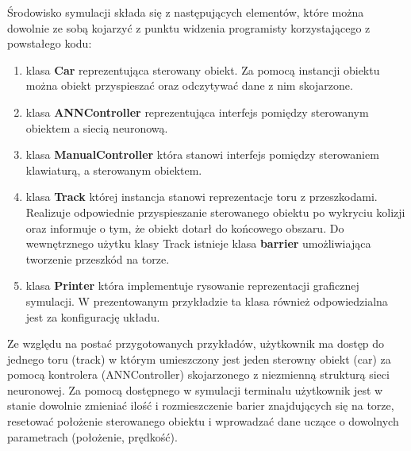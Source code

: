 \documentclass{article}
\begin{document}
\indent Środowisko symulacji składa się z następujących elementów, które można dowolnie ze sobą kojarzyć z punktu widzenia programisty korzystającego z powstałego kodu:
\begin{enumerate}
	\item klasa \textbf{Car} reprezentująca sterowany obiekt. Za pomocą instancji obiektu można obiekt przyspieszać oraz odczytywać dane z nim skojarzone.
		\item klasa \textbf{ANNController} reprezentująca interfejs pomiędzy sterowanym obiektem a siecią neuronową. 
	\item klasa \textbf{ManualController} która stanowi interfejs pomiędzy sterowaniem klawiaturą, a sterowanym obiektem.
	\item klasa \textbf{Track} której instancja stanowi reprezentacje toru z przeszkodami. Realizuje odpowiednie przyspieszanie sterowanego obiektu po wykryciu kolizji oraz informuje o tym, że obiekt dotarł do końcowego obszaru. Do wewnętrznego użytku klasy Track istnieje klasa \textbf{barrier} umożliwiająca tworzenie przeszkód na torze.
	\item klasa \textbf{Printer} która implementuje rysowanie reprezentacji graficznej symulacji. W prezentowanym przykładzie ta klasa również odpowiedzialna jest za konfigurację układu.
\end{enumerate}

\indent Ze względu na postać przygotowanych przykładów, użytkownik ma dostęp do jednego toru (track) w którym umieszczony jest jeden sterowny obiekt (car) za pomocą kontrolera (ANNController) skojarzonego z niezmienną strukturą sieci neuronowej. Za pomocą dostępnego w symulacji terminalu użytkownik jest w stanie dowolnie zmieniać ilość i rozmieszczenie barier znajdujących się na torze, resetować położenie sterowanego obiektu i wprowadzać dane uczące o dowolnych parametrach (położenie, prędkość).

\newpage
\end{document}
